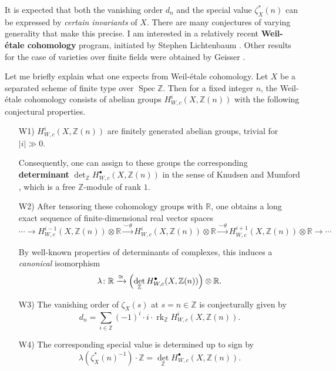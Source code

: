 \documentclass{article}
\DeclareMathOperator{\Spec}{Spec}
\DeclareMathOperator{\rk}{rk}
\newcommand{\ZZ}{\mathbb{Z}}
\newcommand{\RR}{\mathbb{R}}
\begin{document}
It is expected that both the vanishing order $d_n$ and the special value
$\zeta_X^* (n)$ can be expressed by \emph{certain invariants} of $X$. There are
many conjectures of varying generality that make this precise. I am
interested in a relatively recent \textbf{Weil-étale cohomology} program,
initiated by Stephen Lichtenbaum
\cite{Lichtenbaum-05,Lichtenbaum-09-Euler,Lichtenbaum-09-number-rings}. Other
results for the case of varieties over finite fields were obtained by
Geisser \cite{Geisser-2004,Geisser-2006}.

Let me briefly explain what one expects from Weil-étale cohomology. Let $X$ be a
separated scheme of finite type over $\Spec \ZZ$. Then for a fixed integer $n$,
the Weil-étale cohomology consists of abelian groups $H^i_{W,c} (X,\ZZ(n))$ with
the following conjectural properties.

\begin{enumerate}
\item[W1)] $H^i_{W,c} (X,\ZZ(n))$ are finitely generated abelian groups, trivial
  for $|i| \gg 0$.
 
  Consequently, one can assign to these groups the corresponding
  \textbf{determinant} $\det_\ZZ H^\bullet_{W,c} (X, \ZZ(n))$ in the sense of
  Knudsen and Mumford \cite{Knudsen-Mumford-1976}, which is a free $\ZZ$-module
  of rank $1$.

\item[W2)] After tensoring these cohomology groups with $\RR$, one obtains a long
  exact sequence of finite-dimensional real vector spaces
  $$\cdots \to H^{i-1}_{W,c} (X,\ZZ(n)) \otimes \RR \xrightarrow{\smile\theta} H^i_{W,c} (X,\ZZ(n)) \otimes \RR \xrightarrow{\smile\theta} H^{i+1}_{W,c} (X,\ZZ(n)) \otimes \RR \to \cdots$$

  By well-known properties of determinants of complexes, this induces a
  \emph{canonical} isomorphism
  $$\lambda\colon \RR \xrightarrow{\cong} \Bigl(\det_\ZZ H^\bullet_{W,c} (X, \ZZ(n))\Bigr) \otimes \RR.$$

\item[W3)] The vanishing order of $\zeta_X (s)$ at $s = n \in \ZZ$ is
  conjecturally given by
  $$d_n = \sum_{i\in \ZZ} (-1)^i \cdot i \cdot \rk_\ZZ H^i_{W,c} (X,\ZZ(n)).$$

\item[W4)] The corresponding special value is determined up to sign by
  $$\lambda (\zeta_X^* (n)^{-1})\cdot \ZZ = \det_\ZZ H^\bullet_{W,c} (X, \ZZ (n)).$$
\end{enumerate}
\end{document}
